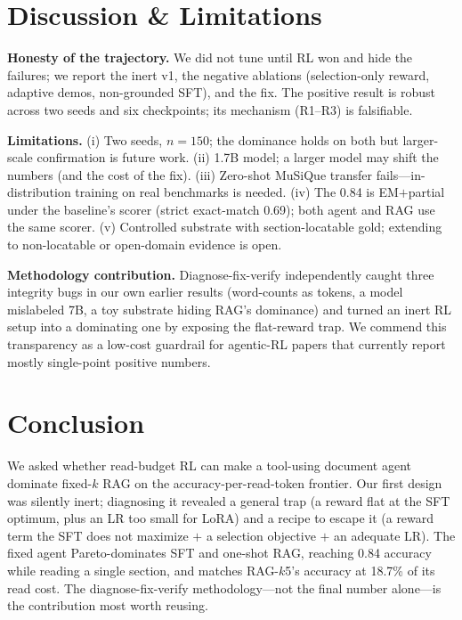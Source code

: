 \documentclass[10pt,twocolumn]{article}
\begin{document}
\section{Discussion \& Limitations}
\textbf{Honesty of the trajectory.} We did not tune until RL won and hide the failures; we report the inert v1, the negative ablations (selection-only reward, adaptive demos, non-grounded SFT), and the fix. The positive result is robust across two seeds and six checkpoints; its mechanism (R1--R3) is falsifiable.

\textbf{Limitations.} (i) Two seeds, $n{=}150$; the dominance holds on both but larger-scale confirmation is future work. (ii) 1.7B model; a larger model may shift the numbers (and the cost of the fix). (iii) Zero-shot MuSiQue transfer fails---in-distribution training on real benchmarks is needed. (iv) The 0.84 is EM$+$partial under the baseline's scorer (strict exact-match 0.69); both agent and RAG use the same scorer. (v) Controlled substrate with section-locatable gold; extending to non-locatable or open-domain evidence is open.

\textbf{Methodology contribution.} Diagnose-fix-verify independently caught three integrity bugs in our own earlier results (word-counts as tokens, a model mislabeled 7B, a toy substrate hiding RAG's dominance) and turned an inert RL setup into a dominating one by exposing the flat-reward trap. We commend this transparency as a low-cost guardrail for agentic-RL papers that currently report mostly single-point positive numbers.

\section{Conclusion}
We asked whether read-budget RL can make a tool-using document agent dominate fixed-$k$ RAG on the accuracy-per-read-token frontier. Our first design was silently inert; diagnosing it revealed a general trap (a reward flat at the SFT optimum, plus an LR too small for LoRA) and a recipe to escape it (a reward term the SFT does not maximize $+$ a selection objective $+$ an adequate LR). The fixed agent Pareto-dominates SFT and one-shot RAG, reaching 0.84 accuracy while reading a single section, and matches RAG-$k$5's accuracy at 18.7\% of its read cost. The diagnose-fix-verify methodology---not the final number alone---is the contribution most worth reusing.




\appendix
\end{document}
